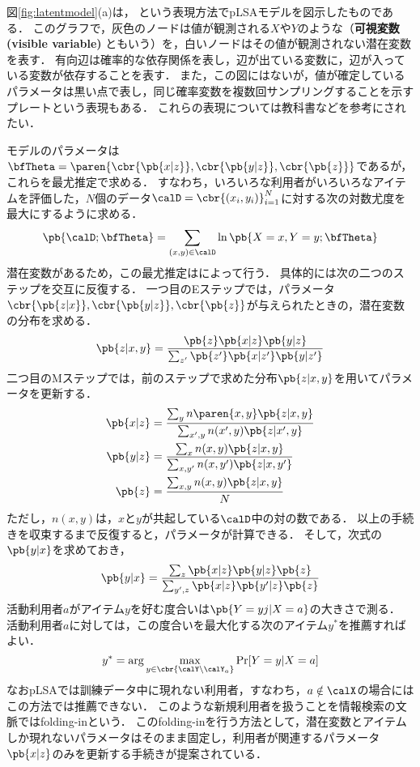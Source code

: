 図\ref{fig:latentmodel}(a)は， という表現方法でpLSAモデルを図示したものである．
このグラフで，灰色のノードは値が観測される$X$や$Y$のような（\textbf{可視変数 (visible variable)} ともいう）を，白いノードはその値が観測されない潜在変数を表す．
有向辺は確率的な依存関係を表し，辺が出ている変数に，辺が入っている変数が依存することを表す．
また，この図にはないが，値が確定しているパラメータは黒い点で表し，同じ確率変数を複数回サンプリングすることを示すプレートという表現もある．
これらの表現については教科書\cite[8章]{jpublist:077x}などを参考にされたい．

モデルのパラメータは$\bfTheta = \paren{\cbr{\pb{x|z}}, \cbr{\pb{y|z}},\cbr{\pb{z}}}$であるが，これらを最尤推定で求める．
すなわち，いろいろな利用者がいろいろなアイテムを評価した，$N$個のデータ$\calD=\cbr{(x_i,y_i)}_{i=1}^N$に対する次の対数尤度を最大にするように求める．
\[
\pb{\calD; \bfTheta} = \sum_{(x,y)\in \calD} \ln\pb{X=x, Y=y; \bfTheta}
\]
潜在変数があるため，この最尤推定は\cite{jrss:77:01,jpublist:077x}によって行う．
具体的には次の二つのステップを交互に反復する．
一つ目のEステップでは，パラメータ$\cbr{\pb{z|x}},\cbr{\pb{y|z}},\cbr{\pb{z}}$が与えられたときの，潜在変数
の分布を求める．
\begin{equation}
\pb{z|x,y}=\frac{\pb{z}\pb{x|z}\pb{y|z}}{\sum_{z'}\pb{z'}\pb{x|z'}\pb{y|z'}}
\label{eq:estep}
\end{equation}
二つ目のMステップでは，前のステップで求めた分布$\pb{z|x,y}$を用いてパラメータを更新する．
\begin{align}
\pb{x|z} & = \frac{\sum_y n\paren{x,y} \pb{z|x,y}}{\sum_{x',y}n(x',y)\pb{z|x',y}}\label{eq:mstepx}\\
\pb{y|z} & = \frac{\sum_x n(x,y) \pb{z|x,y}}{\sum_{x,y'} n(x,y') \pb{z|x,y'}}\label{eq:mstepy}\\
\pb{z} &=\frac{\sum_{x,y}n(x,y)\pb{z|x,y}}{N}\label{eq:mstepz}
\end{align}
ただし，$n(x,y)$は，$x$と$y$が共起している$\calD$中の対の数である．
以上の手続きを収束するまで反復すると，パラメータが計算できる．
そして，次式の$\pb{y|x}$を求めておき，
\begin{equation}
\pb{y|x} = \frac{\sum_z\pb{x|z} \pb{y|z} \pb{z}}{\sum_{y',z}\pb{x|z} \pb{y'|z} \pb{z}}
\end{equation}
活動利用者$a$がアイテム$y$を好む度合いは$\pb{Y=yj|X=a}$の大きさで測る．
活動利用者$a$に対しては，この度合いを最大化する次のアイテム$y^\ast$を推薦すればよい．
\begin{equation}
y^\ast=\arg\max_{y\in\cbr{\calY\backslash\calY_{a}}}\Pr[Y=y|X=a]
\end{equation}
なおpLSAでは訓練データ中に現れない利用者，すなわち，$a\notin\calX$の場合にはこの方法では推薦できない．
このような新規利用者を扱うことを情報検索の文脈ではfolding-inという．
このfolding-inを行う方法として，潜在変数とアイテムしか現れないパラメータはそのまま固定し，利用者が関連するパラメータ$\pb{x|z}$のみを更新する手続きが提案されている\cite{misc:089}．

